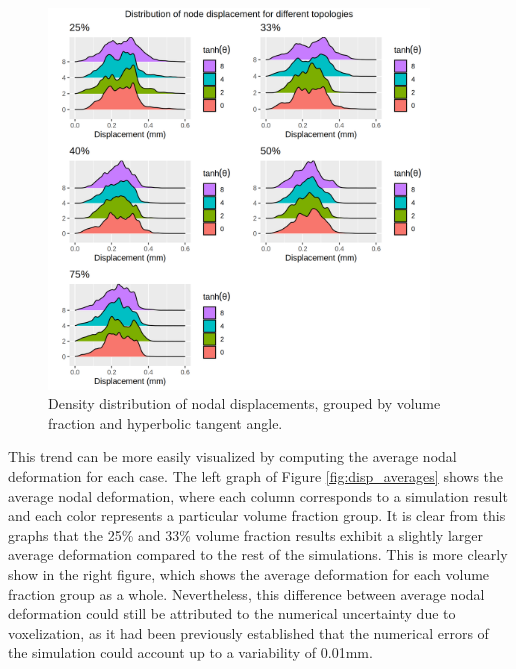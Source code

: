 \documentclass[../main.tex]{subfiles}
\begin{document}
\begin{figure}[h!]
  \centering
  \includegraphics[width=0.9\textwidth]{images/results/plots/femoral/displacement/disp_density_ridges.png}
  \caption{Density distribution of nodal displacements, grouped by volume fraction and hyperbolic tangent angle.}
  \label{fig:disp_ridges}
\end{figure}

This trend can be more easily visualized by computing the average nodal deformation for each case. The left graph of Figure \ref{fig:disp_averages} shows the average nodal deformation, where each column corresponds to a simulation result and each color represents a particular volume fraction group. It is clear from this graphs that the 25\% and 33\% volume fraction results exhibit a slightly larger average deformation compared to the rest of the simulations. This is more clearly show in the right figure, which shows the average deformation for each volume fraction group as a whole. Nevertheless, this difference between average nodal deformation could still be attributed to the numerical uncertainty due to voxelization, as it had been previously established that the numerical errors of the simulation could account up to a variability of 0.01mm.
\end{document}
